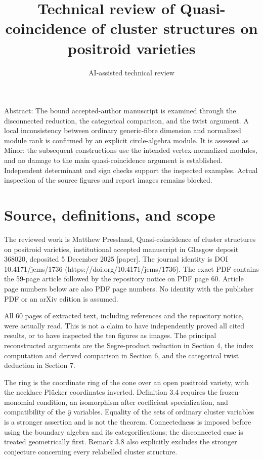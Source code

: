 \documentclass[10pt]{article}
\title{Technical review of Quasi-coincidence of cluster structures on positroid varieties}
\author{AI-assisted technical review}
\date{}
\begin{document}
\maketitle
Abstract: The bound accepted-author manuscript is examined through the disconnected reduction, the categorical comparison, and the twist argument. A local inconsistency between ordinary generic-fibre dimension and normalized module rank is confirmed by an explicit circle-algebra module. It is assessed as Minor: the subsequent constructions use the intended vertex-normalized modules, and no damage to the main quasi-coincidence argument is established. Independent determinant and sign checks support the inspected examples. Actual inspection of the source figures and report images remains blocked.\par
\section*{Source, definitions, and scope}
The reviewed work is Matthew Pressland, Quasi-coincidence of cluster structures on positroid varieties, institutional accepted manuscript in Glasgow deposit 368020, deposited 5 December 2025 [paper]. The journal identity is DOI 10.4171/jems/1736 (https://doi.org/10.4171/jems/1736). The exact PDF contains the 59-page article followed by the repository notice on PDF page 60. Article page numbers below are also PDF page numbers. No identity with the publisher PDF or an arXiv edition is assumed.\par
All 60 pages of extracted text, including references and the repository notice, were actually read. This is not a claim to have independently proved all cited results, or to have inspected the ten figures as images. The principal reconstructed arguments are the Segre-product reduction in Section 4, the index computation and derived comparison in Section 6, and the categorical twist deduction in Section 7.\par
The ring is the coordinate ring of the cone over an open positroid variety, with the necklace Plücker coordinates inverted. Definition 3.4 requires the frozen-monomial condition, an isomorphism after coefficient specialization, and compatibility of the \(\widehat y\) variables. Equality of the sets of ordinary cluster variables is a stronger assertion and is not the theorem. Connectedness is imposed before using the boundary algebra and its categorifications; the disconnected case is treated geometrically first. Remark 3.8 also explicitly excludes the stronger conjecture concerning every relabelled cluster structure.\par
\end{document}
